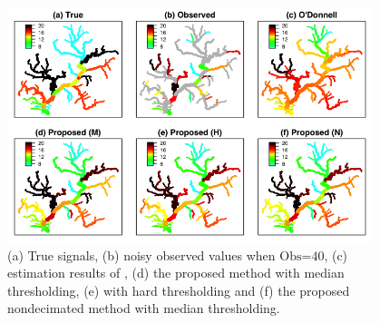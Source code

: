 \documentclass[11pt,titlepage]{article}
\begin{document}


\begin{figure}
	\centering\includegraphics[width=0.95\textwidth]{Stream_Result/SLifting_Comp_02.png}
	\vspace{-4mm}\caption{(a) True signals, (b) noisy observed values when $\text{Obs=40}$, (c) estimation results of \cite{ODonnell2014}, (d) the proposed method with median thresholding, (e) with hard thresholding and (f) the proposed nondecimated method with median thresholding.} %
	\label{fig:streamsimresult}
\end{figure}
\end{document}
